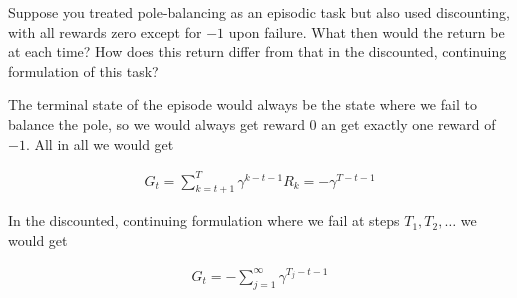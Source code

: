 \begin{exercise}
Suppose you treated pole-balancing as an episodic task but also used discounting, with all rewards zero except for $-1$ upon failure.
What then would the return be at each time?
How does this return differ from that in the discounted, continuing formulation of this task?
\end{exercise}

\begin{solution}
The terminal state of the episode would always be the state where we fail to balance the pole, so we would always get reward $0$ an get exactly one reward of $-1$. All in all we would get

\begin{align*}
  G_t
  =
  \sum_{k=t+1}^T \gamma^{k-t-1} R_k
  =
  -\gamma^{T-t-1}
\end{align*}

In the discounted, continuing formulation where we fail at steps $T_1, T_2, \dots$ we would get

\begin{align*}
  G_t
  =
  -\sum_{j = 1}^\infty \gamma^{T_j - t - 1} 
\end{align*}
\end{solution}
